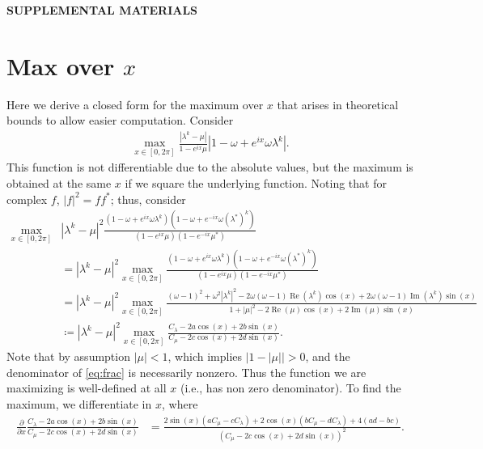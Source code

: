 \documentclass[VANCOUVER,STIX1COL]{WileyNJD-v2}
\newcommand{\Rea}{\operatorname{Re}}
\newcommand{\Ima}{\operatorname{Im}}
\begin{document}
\clearpage
\noindent\large{\textbf{SUPPLEMENTAL MATERIALS}}
\setcounter{section}{0}
\renewcommand{\thesection}{S\arabic{section}}
\renewcommand{\thetable}{S\arabic{table}}
\renewcommand{\thefigure}{S\arabic{figure}}

\section{Max over $x$}

Here we derive a closed form for the maximum over $x$ that arises
in theoretical bounds to allow easier computation. Consider 
%
\begin{align}\label{eq:bound0}
\max_{x\in[0,2\pi]} \frac{|\lambda^k - \mu|}{1 - e^{ix}\mu}
	|1-\omega + e^{ix}\omega\lambda^k|.
\end{align}
%
This function is not differentiable due to the absolute values, but the
maximum is obtained at the same $x$ if we square the underlying function.
Noting that for complex $f$, $|f|^2 = ff^*$; thus, consider
%
\begin{align}
\max_{x\in[0,2\pi]} & |\lambda^k - \mu|^2
	\frac{(1-\omega + e^{ix}\omega\lambda^k)(1-\omega + e^{-ix}\omega(\lambda^*)^k)}
	{(1 - e^{ix}\mu)(1 - e^{-ix}\mu^*)} \nonumber\\
& = |\lambda^k - \mu|^2 \max_{x\in[0,2\pi]}
	\frac{(1-\omega + e^{ix}\omega\lambda^k)(1-\omega + e^{-ix}\omega(\lambda^*)^k)}
	{(1 - e^{ix}\mu)(1 - e^{-ix}\mu^*)} \nonumber\\
& = |\lambda^k - \mu|^2 \max_{x\in[0,2\pi]}
	\frac{(\omega - 1)^2 + \omega^2|\lambda^k|^2- 2\omega(\omega - 1)\Rea(\lambda^k)\cos(x) +
		2\omega(\omega - 1)\Ima(\lambda^k)\sin(x)}
	{1 + |\mu|^2 - 2\Rea(\mu)\cos(x) + 2\Ima(\mu)\sin(x)} \nonumber \\
& \coloneqq |\lambda^k - \mu|^2 \max_{x\in[0,2\pi]}
	\frac{C_\lambda - 2a\cos(x) + 2b\sin(x)}
	{C_\mu - 2c\cos(x) + 2d\sin(x)} \label{eq:frac}.
\end{align}
%
Note that by assumption $|\mu| < 1$, which implies $|1 - |\mu|| > 0$, and the
denominator of \eqref{eq:frac} is necessarily nonzero. Thus the function we are
maximizing is well-defined at all $x$ (i.e., has non zero denominator). To find
the maximum, we differentiate in $x$, where
%
\begin{align*}
\frac{\partial}{\partial x} \frac{C_\lambda - 2a\cos(x) + 2b\sin(x)}
	{C_\mu - 2c\cos(x) + 2d\sin(x)} 
& = \frac{2\sin(x)(aC_\mu - cC_\lambda) + 2\cos(x)(bC_\mu - dC_\lambda) + 4(ad -bc)}
	{(C_\mu - 2c\cos(x) + 2d\sin(x))^2}.
\end{align*}
\end{document}
